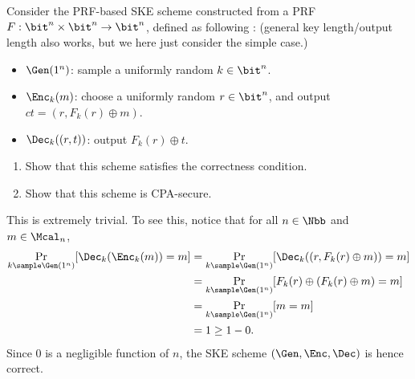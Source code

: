 \begin{problem}\label{p4}
    \leavevmode\par
    Consider the PRF-based SKE scheme constructed from a PRF $F:\bit^n\times \bit^n\to \bit^n$, defined as following : (general key length/output length also works, but we here just consider the simple case.)
    \begin{itemize}
        \item $\Gen(1^n)$: sample a uniformly random $k\in\bit^n$.
        \item $\Enc_k(m)$: choose a uniformly random $r\in\bit^n$, and output $ct = (r, F_k(r)\oplus m)$.
        \item $\Dec_k((r,t))$: output $F_k(r)\oplus t$. 
    \end{itemize}
    \begin{enumerate}[label=(\roman*)]
        \item Show that this scheme satisfies the correctness condition.
        \item Show that this scheme is CPA-secure.
    \end{enumerate}
\end{problem}



\begin{answer}[i]
    This is extremely trivial. To see this, notice that for all $n\in\Nbb$ and $m\in \Mcal_n$,
    \begin{align*}
        \Pr_{k\sample\Gen(1^n)}[\Dec_k(\Enc_k(m))=m]
        &= \Pr_{k\sample\Gen(1^n)}[\Dec_k((r, F_k(r)\oplus m))=m]\\
        &= \Pr_{k\sample\Gen(1^n)}[F_k(r)\oplus ( F_k(r)\oplus m)=m]\\
        &= \Pr_{k\sample\Gen(1^n)}[m=m]\\
        &= 1\ge 1-0.
    \end{align*}
    Since $0$ is a negligible function of $n$, the SKE scheme $(\Gen, \Enc,\Dec)$ is hence correct.  
\end{answer}




